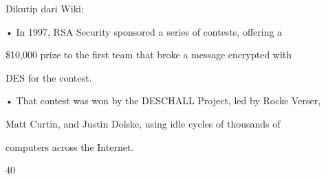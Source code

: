 \documentclass{article}
\begin{document}

Dikutip dari Wiki:

• In 1997, RSA Security sponsored a series of contests, offering a 

\$10,000 prize to the first team that broke a message encrypted with 

DES for the contest. 

• That contest was won by the DESCHALL Project, led by Rocke Verser, 

Matt Curtin, and Justin Dolske, using idle cycles of thousands of 

computers across the Internet. 

40
\end{document}
